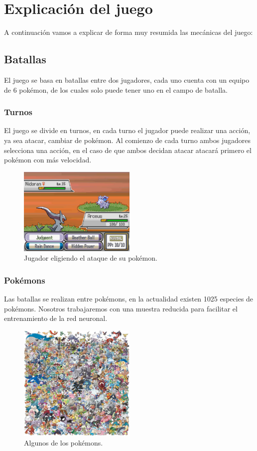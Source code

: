 \chapter{Explicación del juego}
A continuación vamos a explicar de forma muy resumida las mecánicas del juego:

\section{Batallas}

El juego se basa en batallas entre dos jugadores, cada uno cuenta con un equipo de 6 pokémon, de los cuales solo puede tener uno en el campo de batalla. 

\subsection{Turnos}
El juego se divide en turnos, en cada turno el jugador puede realizar una acción, ya sea atacar, cambiar de pokémon. Al comienzo de cada turno ambos jugadores selecciona una acción, en el caso de que ambos decidan atacar atacará primero el pokémon con más velocidad. 

\begin{figure}[H]
        \centering
        \includegraphics[width=0.5\textwidth]{figures/combat.jpg}
        \caption{Jugador eligiendo el ataque de su pokémon.}
        \label{fig:turn}
\end{figure}

\subsection{Pokémons}
Las batallas se realizan entre pokémons, en la actualidad existen 1025 especies de pokémons. Nosotros trabajaremos con una muestra reducida para facilitar el entrenamiento de la red neuronal.

\begin{figure}[H]
	\centering
	\includegraphics[width=0.5\textwidth]{figures/pokemons.jpg}
	\caption{Algunos de los pokémons.}
	\label{fig:pokemon}
\end{figure}

